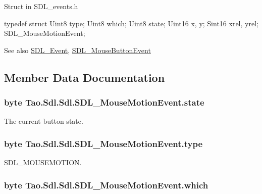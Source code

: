Struct in SDL\_\-events.h 
\begin{DoxyCode}
            typedef struct{
                        Uint8 type;
                        Uint8 which;
                        Uint8 state;
                        Uint16 x, y;
                        Sint16 xrel, yrel;
                } SDL_MouseMotionEvent;
\end{DoxyCode}


\begin{DoxySeeAlso}{See also}
\hyperlink{struct_tao_1_1_sdl_1_1_s_d_l___event}{SDL\_\-Event}, \hyperlink{struct_tao_1_1_sdl_1_1_sdl_1_1_s_d_l___mouse_button_event}{SDL\_\-MouseButtonEvent}


\end{DoxySeeAlso}


\subsection{Member Data Documentation}
\hypertarget{struct_tao_1_1_sdl_1_1_sdl_1_1_s_d_l___mouse_motion_event_a127c27891c775cd2318ba70f09d0c82c}{
\subsubsection[{state}]{\setlength{\rightskip}{0pt plus 5cm}byte {\bf Tao.Sdl.Sdl.SDL\_\-MouseMotionEvent.state}}}
\label{struct_tao_1_1_sdl_1_1_sdl_1_1_s_d_l___mouse_motion_event_a127c27891c775cd2318ba70f09d0c82c}


The current button state. 

\hypertarget{struct_tao_1_1_sdl_1_1_sdl_1_1_s_d_l___mouse_motion_event_a8e2b9add20b3993257ea3017d2dde4f4}{
\subsubsection[{type}]{\setlength{\rightskip}{0pt plus 5cm}byte {\bf Tao.Sdl.Sdl.SDL\_\-MouseMotionEvent.type}}}
\label{struct_tao_1_1_sdl_1_1_sdl_1_1_s_d_l___mouse_motion_event_a8e2b9add20b3993257ea3017d2dde4f4}


SDL\_\-MOUSEMOTION. 

\hypertarget{struct_tao_1_1_sdl_1_1_sdl_1_1_s_d_l___mouse_motion_event_a6a09cb83bd7d41bf90c3655efdbe9033}{
\subsubsection[{which}]{\setlength{\rightskip}{0pt plus 5cm}byte {\bf Tao.Sdl.Sdl.SDL\_\-MouseMotionEvent.which}}}
\label{struct_tao_1_1_sdl_1_1_sdl_1_1_s_d_l___mouse_motion_event_a6a09cb83bd7d41bf90c3655efdbe9033}


